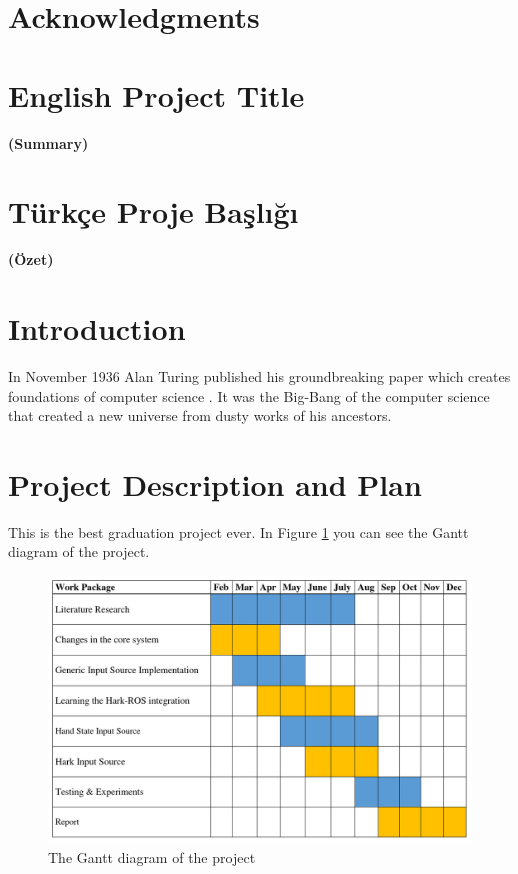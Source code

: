 \documentclass[a4paper, 12pt, titlepage]{article}
\begin{document}
\newpage
\section*{Acknowledgments}

\newpage
\section*{English Project Title}
\centerline{\large\bfseries (Summary)}


\newpage
\section*{Türkçe Proje Başlığı}
\centerline{\large\bfseries (Özet)}

\newpage
\tableofcontents
\newpage

\section{Introduction}
In November 1936 Alan Turing published his groundbreaking paper which creates foundations of computer science \cite{turing1937computability}. It was the Big-Bang of the computer science that created a new universe from dusty works of his ancestors.
\newpage
\section{Project Description and Plan}
This is the best graduation project ever. In Figure \ref{fig:ganttdiagram} you can see the Gantt diagram of the project.

\begin{figure}[H]
    \centering
    \includegraphics[width=\linewidth]{gantt_diagram}
    \caption{The Gantt diagram of the project}
    \label{fig:ganttdiagram}
\end{figure}
\end{document}
